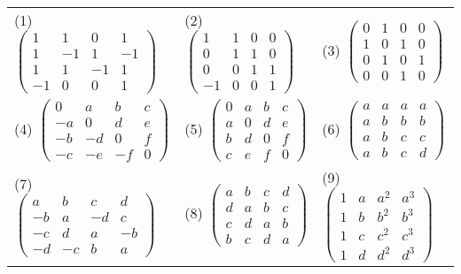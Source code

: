 \documentclass[a4paper,fontset=windows]{ctexbook}
\theoremstyle{definition}
\begin{document}
\begin{enumerate}
\hspace*{-6pt}\begin{tabular}{l@{\qquad\qquad}l@{\qquad\qquad}l}
(1) $\begin{pmatrix}1&1&0&1 \\ 1&-1&1&-1 \\ 1&1&-1&1 \\ -1&0&0&1\end{pmatrix}$ &
(2) $\begin{pmatrix}1&1&0&0 \\ 0&1&1&0 \\ 0&0&1&1 \\ -1&0&0&1\end{pmatrix}$ &
(3) $\begin{pmatrix}0&1&0&0 \\ 1&0&1&0 \\ 0&1&0&1 \\ 0&0&1&0\end{pmatrix}$ \\
(4) $\begin{pmatrix}0&a&b&c \\ -a&0&d&e \\ -b&-d&0&f \\ -c&-e&-f&0\end{pmatrix}$ &
(5) $\begin{pmatrix}0&a&b&c \\ a&0&d&e \\ b&d&0&f \\ c&e&f&0\end{pmatrix}$ &
(6) $\begin{pmatrix}a&a&a&a \\ a&b&b&b \\ a&b&c&c \\ a&b&c&d\end{pmatrix}$ \\
(7) $\begin{pmatrix}a&b&c&d \\ -b&a&-d&c \\ -c&d&a&-b \\ -d&-c&b&a\end{pmatrix}$ &
(8) $\begin{pmatrix}a&b&c&d \\ d&a&b&c \\ c&d&a&b \\ b&c&d&a\end{pmatrix}$ &
(9) $\begin{pmatrix}1&a&a^2&a^3 \\ 1&b&b^2&b^3 \\ 1&c&c^2&c^3 \\ 1&d&d^2&d^3\end{pmatrix}$
\end{tabular}


\end{enumerate}
\end{document}
